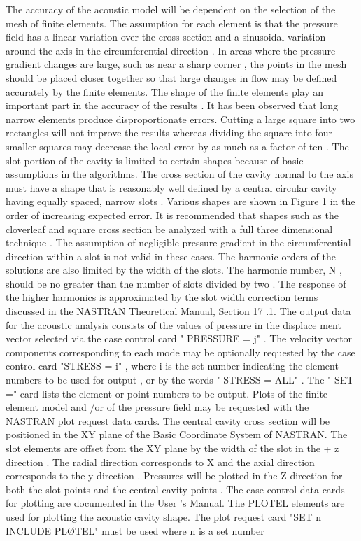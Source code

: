 \documentclass{article}
\begin{document}
The accuracy of the acoustic model will be dependent on the selection of the mesh of finite
elements.
The assumption for each element is that the pressure field has a linear variation over
the cross section and a sinusoidal variation around the axis in the circumferential direction . In
areas where the pressure gradient changes are large, such as near a sharp corner , the points in
the mesh should be placed closer together so that large changes in flow may be defined accurately
by the finite elements.
The shape of the finite elements play an important part in the accuracy of the results .
It
has been observed that long narrow elements produce disproportionate errors. Cutting a large 
square into two rectangles will not improve the results whereas dividing the square into four
smaller squares may decrease the local error by as much as a factor of ten .
The slot portion of the cavity is limited to certain shapes because of basic assumptions in
the algorithms.
The cross section of the cavity normal to the axis must have a shape that is
reasonably well defined by a central circular cavity having equally spaced, narrow slots . Various
shapes are shown in Figure 1 in the order of increasing expected error.
It is recommended that shapes such as the cloverleaf and square cross section be analyzed
with a full three dimensional technique . The assumption of negligible pressure gradient in the
circumferential direction within a slot is not valid in these cases.
The harmonic orders of the solutions are also limited by the width of the slots. The
harmonic number, N , should be no greater than the number of slots divided by two .
The response
of the higher harmonics is approximated by the slot width correction terms discussed in the
NASTRAN Theoretical Manual, Section 17 .1.
The output data for the acoustic analysis consists of the values of pressure in the displace
ment vector selected via the case control card " PRESSURE = j" . The velocity vector components
corresponding to each mode may be optionally requested by the case control card "STRESS = i" ,
where i is the set number indicating the element numbers to be used for output , or by the words
" STRESS = ALL" .
The " SET =" card lists the element or point numbers to be output.
Plots of the finite element model and /or of the pressure field may be requested with the
NASTRAN plot request data cards.
The central cavity cross section will be positioned in the XY
plane of the Basic Coordinate System of NASTRAN. The slot elements are offset from the XY plane
by the width of the slot in the + z direction . The radial direction corresponds to X and the
axial direction corresponds to the y direction . Pressures will be plotted in the Z direction for
both the slot points and the central cavity points . The case control data cards for plotting are
documented in the User 's Manual. The PLOTEL elements are used for plotting the acoustic cavity
shape. The plot request card "SET n INCLUDE PLØTEL" must be used where n is a set number
\end{document}
